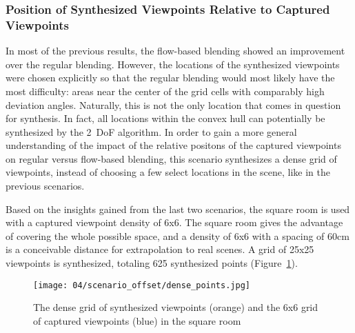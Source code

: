 \subsubsection{Position of Synthesized Viewpoints Relative to Captured Viewpoints}
In most of the previous results, the flow-based blending showed an improvement over the regular blending. However, the locations of the synthesized viewpoints were chosen explicitly so that the regular blending would most likely have the most difficulty: areas near the center of the grid cells with comparably high deviation angles. Naturally, this is not the only location that comes in question for synthesis. In fact, all locations within the convex hull can potentially be synthesized by the 2~DoF algorithm. In order to gain a more general understanding of the impact of the relative positons of the captured viewpoints on regular versus flow-based blending, this scenario synthesizes a dense grid of viewpoints, instead of choosing a few select locations in the scene, like in the previous scenarios.

Based on the insights gained from the last two scenarios, the square room is used with a captured viewpoint density of 6x6. The square room gives the advantage of covering the whole possible space, and a density of 6x6 with a spacing of 60cm is a conceivable distance for extrapolation to real scenes. A grid of 25x25 viewpoints is synthesized, totaling 625 synthesized points (Figure~\ref{fig:scenario_offset_setup}).

\begin{figure}
		\centering
		\texttt{[image: 04/scenario\_offset/dense\_points.jpg]}
		\caption[The dense grid of synthesized viewpoints in the square room]{The dense grid of synthesized viewpoints (orange) and the 6x6 grid of captured viewpoints (blue) in the square room}
		\label{fig:scenario_offset_setup}
\end{figure}

